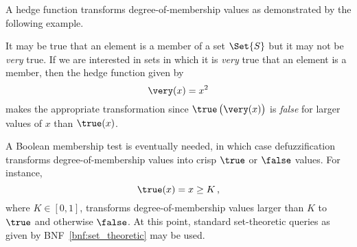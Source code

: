 \documentclass[ ../main.tex]{subfiles}
\begin{document}
A hedge function transforms degree-of-membership values as demonstrated by the following example.
\begin{example}
It may be true that an element is a member of a set $\Set{S}$ but it may not be \emph{very} true. If we are interested in sets in which it is \emph{very} true that an element is a member, then the hedge function given by
\begin{equation}
    \very(x) = x^2
\end{equation}
makes the appropriate transformation since $\true\left(\very(x)\right)$ is \emph{false} for larger values of $x$ than $\true(x)$.
\end{example}

A Boolean membership test is eventually needed, in which case defuzzification transforms degree-of-membership values into crisp $\true$ or $\false$ values. For instance,
\begin{equation}
    \true(x) = x \geq K\,,
\end{equation}
where $K \in [0,1]$, transforms degree-of-membership values larger than $K$ to $\true$ and otherwise $\false$. At this point, standard set-theoretic queries as given by BNF~\ref{bnf:set_theoretic} may be used.
\end{document}
